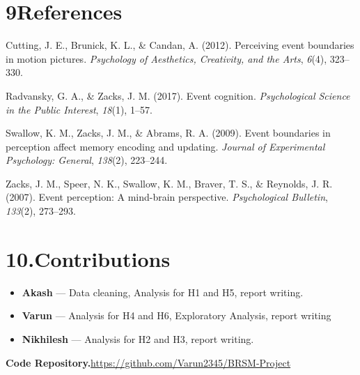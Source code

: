 \documentclass[11pt]{article}
\begin{document}
\section*{9\quad References}
{\small\setlength{\parindent}{-2em}\setlength{\leftskip}{2em}\setlength{\parskip}{2pt}

Cutting, J. E., Brunick, K. L., \& Candan, A. (2012). Perceiving event boundaries in motion pictures. \textit{Psychology of Aesthetics, Creativity, and the Arts}, \textit{6}(4), 323--330.

Radvansky, G. A., \& Zacks, J. M. (2017). Event cognition. \textit{Psychological Science in the Public Interest}, \textit{18}(1), 1--57.

Swallow, K. M., Zacks, J. M., \& Abrams, R. A. (2009). Event boundaries in perception affect memory encoding and updating. \textit{Journal of Experimental Psychology: General}, \textit{138}(2), 223--244.

Zacks, J. M., Speer, N. K., Swallow, K. M., Braver, T. S., \& Reynolds, J. R. (2007). Event perception: A mind-brain perspective. \textit{Psychological Bulletin}, \textit{133}(2), 273--293.

}

\section*{10.\quad Contributions}

\begin{itemize}
  \item \textbf{Akash} --- Data cleaning, Analysis for H1 and H5, report writing.
  \item \textbf{Varun} --- Analysis for H4 and H6, Exploratory Analysis, report writing
  \item \textbf{Nikhilesh} --- Analysis for H2 and H3, report writing.
\end{itemize}

\medskip
\noindent\textbf{Code Repository.}\quad \url{https://github.com/Varun2345/BRSM-Project}
\end{document}
